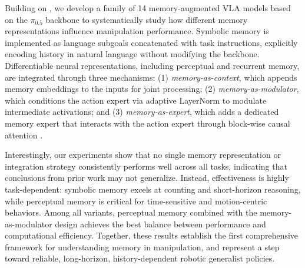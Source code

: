 Building on \benchname, we develop a family of 14 memory-augmented VLA models based on the $\pi_{0.5}$ backbone \cite{pi05} to systematically study how different memory representations influence manipulation performance.
Symbolic memory is implemented as language subgoals concatenated with task instructions, explicitly encoding history in natural language without modifying the backbone.
Differentiable neural representations, including perceptual and recurrent memory, are integrated through three mechanisms:
(1) \textit{memory-as-context}, which appends memory embeddings to the inputs for joint processing;
(2) \textit{memory-as-modulator}, which conditions the action expert via adaptive LayerNorm  \cite{peebles2023scalable} to modulate intermediate activations; and
(3) \textit{memory-as-expert}, which adds a dedicated memory expert that interacts with the action expert through block-wise causal attention \cite{pi0}.

Interestingly, our experiments show that no single memory representation or integration strategy consistently performs well across all tasks, indicating that conclusions from prior work may not generalize. Instead, effectiveness is highly task-dependent: symbolic memory excels at counting and short-horizon reasoning, while perceptual memory is critical for time-sensitive and motion-centric behaviors. Among all variants, perceptual memory combined with the memory-as-modulator design achieves the best balance between performance and computational efficiency. Together, these results establish the first comprehensive framework for understanding memory in manipulation, and represent a step toward reliable, long-horizon, history-dependent robotic generalist policies.
